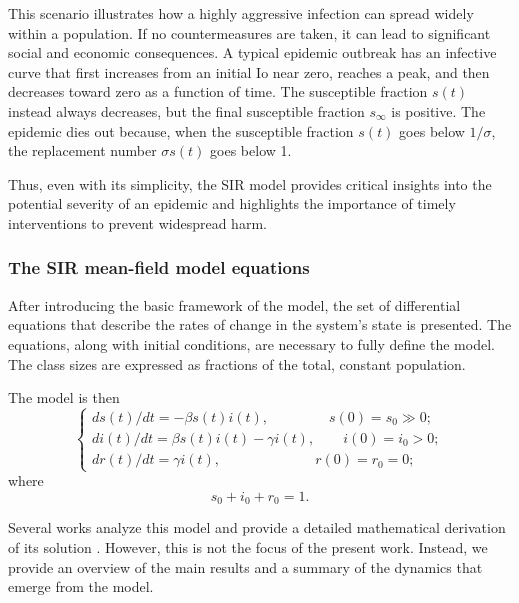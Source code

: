 \begin{itemize}
	This scenario illustrates how a highly aggressive infection can spread widely within a population. If no countermeasures are taken, it can lead to significant social and economic consequences. A typical epidemic outbreak has an infective curve that first increases from an initial Io near zero, reaches a peak, and then
	decreases toward zero as a function of time. The susceptible fraction $s(t)$ instead always
	decreases, but the final susceptible fraction $s_\infty$ is positive. The epidemic dies out because, when the susceptible fraction $s(t)$ goes below $1/\sigma$, the replacement number $\sigma s(t)$ goes below 1.
		
\end{itemize}
	Thus, even with its simplicity, the SIR model provides critical insights into the potential severity of an epidemic and highlights the importance of timely interventions to prevent widespread harm.
	

\subsubsection{The SIR mean-field model equations}
After introducing the basic framework of the model, the set of differential equations that describe the rates of change in the system's state is presented. The equations, along with initial conditions, are necessary to fully define the model. The class sizes are expressed as fractions of the total, constant population.

The model is then
\begin{equation}
	\begin{cases}
		ds(t) / dt = -\beta s(t) i(t), \;\qquad \qquad s(0) = s_0 \gg 0;\\
		di(t) / dt =  \beta s(t) i(t) - \gamma i(t), \qquad i(0) = i_0 > 0;\\
		dr(t) / dt =  \gamma i(t), \qquad \; \, \;\quad \quad \qquad r(0) = r_0 = 0;
	\end{cases}
\end{equation}
where
\begin{equation}
s_0 + i_0 + r_0 = 1.
\end{equation}

Several works analyze this model and provide a detailed mathematical derivation of its solution \cite{diekmann2000mathematical,akinboro2014numerical,Turkyilmazoglu_2021}. However, this is not the focus of the present work. Instead, we provide an overview of the main results and a summary of the dynamics that emerge from the model.

